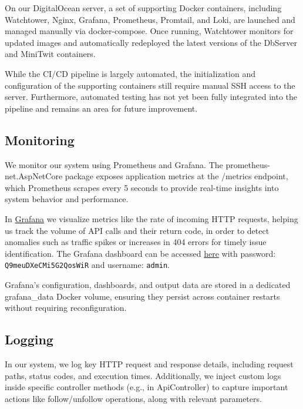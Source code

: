 \documentclass[12pt,a4paper,reqno]{report}
\begin{document}
On our DigitalOcean server, a set of supporting Docker containers, including Watchtower, Nginx, Grafana, Prometheus, Promtail, and Loki, are launched and managed manually via docker-compose. Once running, Watchtower monitors for updated images and automatically redeployed the latest versions of the DbServer and MiniTwit containers.

While the CI/CD pipeline is largely automated, the initialization and configuration of the supporting containers still require manual SSH access to the server. Furthermore, automated testing has not yet been fully integrated into the pipeline and remains an area for future improvement.

\subsection{Monitoring}

We monitor our system using Prometheus and Grafana. The prometheus-net.AspNetCore package exposes application metrics at the /metrics endpoint, which Prometheus scrapes every 5 seconds to provide real-time insights into system behavior and performance.

In \href{http://67.207.72.20:3000/d/feh7hq21y4g00a/api-endpoints?orgId=1&from=now-20d&to=now&timezone=browser}{Grafana} we visualize metrics like the rate of incoming HTTP requests, helping us track the volume of API calls and their return code, in order to detect anomalies such as traffic spikes or increases in 404 errors for timely issue identification. The Grafana dashboard can be accessed \href{http://67.207.72.20:3000/d/feh7hq21y4g00a/api-endpoints?orgId=1&from=now-20d&to=now&timezone=browser}{here} with password: \texttt{Q9meuDXeCMi5G2QosWiR} and username: \texttt{admin}.

Grafana’s configuration, dashboards, and output data are stored in a dedicated grafana\_data Docker volume, ensuring they persist across container restarts without requiring reconfiguration.

\subsection{Logging}

In our system, we log key HTTP request and response details, including request paths, status codes, and execution times. Additionally, we inject custom logs inside specific controller methods (e.g., in ApiController) to capture important actions like follow/unfollow operations, along with relevant parameters.
\end{document}
